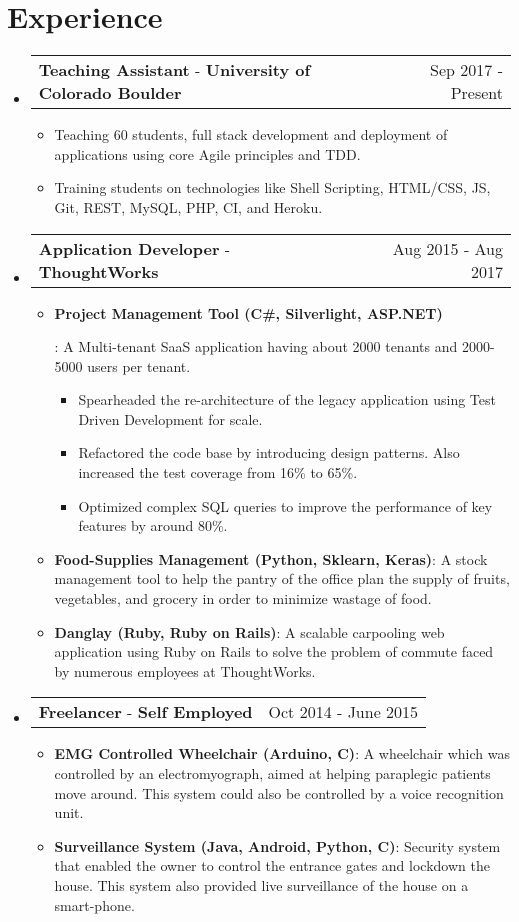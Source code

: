 \documentclass[letterpaper,11pt]{article}
\makeatletter
\newcommand{\resumeItem}[2]{
  \linespread{1.2}
  \item\small{
      \textbf{#1}{: #2}
    }
}
\newcommand{\resumePoint}[1]{
  \linespread{1.2}
  \item\small{#1}
}
\newcommand{\resumeExperienceSubheading}[5]{
  \vspace{-3pt}\item
    \begin{tabular*}{0.97\textwidth}{l@{\extracolsep{\fill}}r}
      \textbf{#1} \normalfont{\small#2} - \textbf{#3}\normalfont{#4} & #5 \\
    \end{tabular*}\vspace{-4pt}
}
\newcommand{\resumeSubHeadingListStart}{\begin{itemize}[leftmargin=*]}
\newcommand{\resumeSubHeadingListEnd}{\end{itemize}\vspace{-14pt}}
\newcommand{\resumeItemListStart}{\begin{itemize}}
\newcommand{\resumeItemListEnd}{\end{itemize}\vspace{-2pt}}
\newcommand{\resumeInnerItemListStart}{\begin{itemize}}
\newcommand{\resumeInnerItemListEnd}{\end{itemize}}
\makeatother
\begin{document}

\section{Experience}
  \resumeSubHeadingListStart
    \resumeExperienceSubheading
      {Teaching Assistant}{\href{https://www.colorado.edu/cs/csci-3308-software-development-methods-and-tools}{(S/W Dev Methods \& Tools)}}{University of Colorado Boulder}{}{Sep 2017 - Present}
      \resumeItemListStart
          \resumePoint{Teaching 60 students, full stack development and deployment of applications using core Agile principles and TDD.}
          \resumePoint{Training students on technologies like Shell Scripting, HTML/CSS, JS, Git, REST, MySQL, PHP, CI, and Heroku.}
      \resumeItemListEnd
    \resumeExperienceSubheading
      {Application Developer}{}{ThoughtWorks}{, Bangalore, India}{Aug 2015 - Aug 2017}
      \resumeItemListStart
      \resumeItem {Project Management Tool (C\#, Silverlight, ASP.NET)}
          {A Multi-tenant SaaS application having about 2000 tenants and 2000-5000 users per tenant.
          \resumeInnerItemListStart
            \resumePoint {Spearheaded the re-architecture of the legacy application using Test Driven Development for scale.}
            \resumePoint {Refactored the code base by introducing design patterns. Also increased the test coverage from 16\% to 65\%.}
            \resumePoint {Optimized complex SQL queries to improve the performance of key features by around 80\%.}
          \resumeInnerItemListEnd}
        \resumeItem {Food-Supplies Management (Python, Sklearn, Keras)}{A stock management tool to help the pantry of the office plan the supply of fruits, vegetables, and grocery in order to minimize wastage of food.}
      \resumeItem {Danglay (Ruby, Ruby on Rails)}{A scalable carpooling web application using Ruby on Rails to solve the problem of commute faced by numerous employees at ThoughtWorks.}
      \resumeItemListEnd
    \resumeExperienceSubheading
      {Freelancer}{(Embedded System Prototyping)}{Self Employed}{, Bangalore, India}{Oct 2014 - June 2015}
      \resumeItemListStart
          \resumeItem{EMG Controlled Wheelchair (Arduino, C)}{A wheelchair which was controlled by an electromyograph, aimed at helping paraplegic patients move around. This system could also be controlled by a voice recognition unit.}
          \resumeItem{Surveillance System (Java, Android, Python, C)}{Security system that enabled the owner to control the entrance gates and lockdown the house. This system also provided live surveillance of the house on a smart-phone.}
      \resumeItemListEnd
  \resumeSubHeadingListEnd
\end{document}
